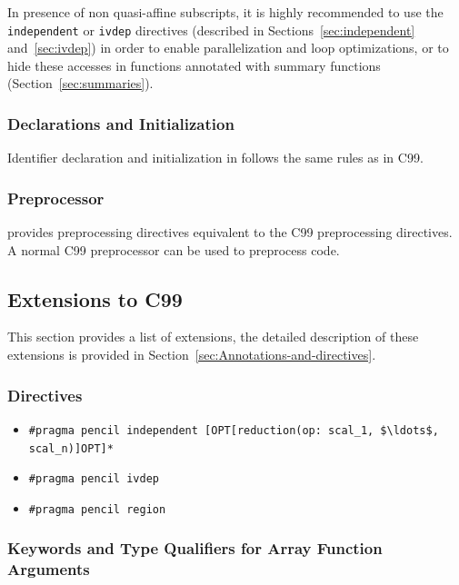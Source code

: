 In presence of non quasi-affine subscripts, it is highly recommended
to use the \lstinline!independent! or \lstinline!ivdep! directives 
(described in Sections~\ref{sec:independent} and~\ref{sec:ivdep})
in order to enable parallelization and loop optimizations, or to hide these
accesses in functions annotated with summary functions
(Section~\ref{sec:summaries}).

\subsubsection{Declarations and Initialization}
Identifier declaration and initialization in \pencil follows the same
rules as in C99.

\subsubsection{Preprocessor}
\pencil provides preprocessing directives equivalent to the C99
preprocessing directives.
A normal C99 preprocessor can be used to preprocess \pencil code.

\subsection{\pencil Extensions to C99}
\label{pencil-extension-short}

This section provides a list of \pencil extensions, the detailed
description of these extensions is provided
in Section~\ref{sec:Annotations-and-directives}.

\subsubsection*{Directives}
\label{sec:for-directives}

\begin{itemize}
\item \lstinline!#pragma pencil independent [OPT[reduction(op: scal_1, $\ldots$, scal_n)]OPT]*!
\item \lstinline!#pragma pencil ivdep!
\item \lstinline!#pragma pencil region!
\end{itemize}

\subsubsection*{Keywords and Type Qualifiers for Array Function Arguments}

